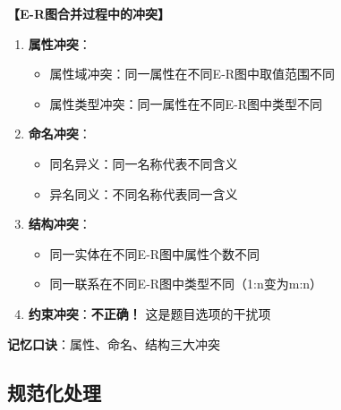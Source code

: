 \documentclass[12pt, a4paper]{article}
\newenvironment{bluebox}[1]{%
  \begin{trivlist}
  \item[\hskip\labelsep \textbf{#1}]
  \setlength{\parskip}{0.5ex}
  \setlength{\itemsep}{0.5ex}
}{%
  \end{trivlist}
  }
\begin{document}
\begin{bluebox}{E-R图合并冲突}
	\textbf{【E-R图合并过程中的冲突】}

	\begin{enumerate}[leftmargin=*, label=\textbf{\arabic*.}]
		\item \textbf{属性冲突}：
		      \begin{itemize}[nosep]
			      \item 属性域冲突：同一属性在不同E-R图中取值范围不同
			      \item 属性类型冲突：同一属性在不同E-R图中类型不同
		      \end{itemize}

		\item \textbf{命名冲突}：
		      \begin{itemize}[nosep]
			      \item 同名异义：同一名称代表不同含义
			      \item 异名同义：不同名称代表同一含义
		      \end{itemize}

		\item \textbf{结构冲突}：
		      \begin{itemize}[nosep]
			      \item 同一实体在不同E-R图中属性个数不同
			      \item 同一联系在不同E-R图中类型不同（1:n变为m:n）
		      \end{itemize}

		\item \textbf{约束冲突}：\textbf{不正确！} 这是题目选项的干扰项
	\end{enumerate}

	\textbf{记忆口诀}：属性、命名、结构三大冲突
\end{bluebox}

\subsection{规范化处理}
\end{document}
